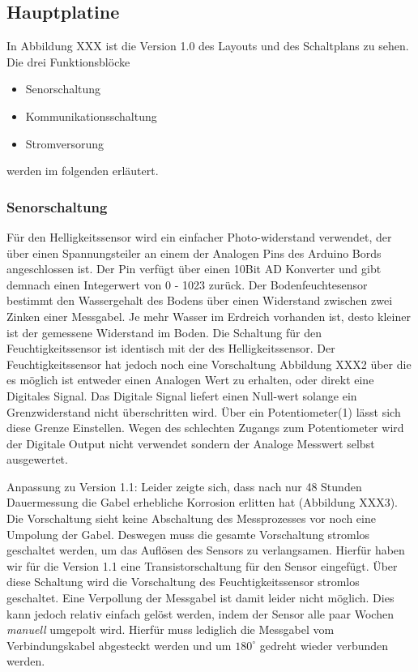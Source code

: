 \documentclass[]{IEEEtran}
\begin{document}
	\subsection{Hauptplatine}
		In Abbildung XXX ist die Version 1.0 des Layouts und des Schaltplans zu sehen. Die drei Funktionsblöcke
			\begin{itemize}
				\item Senorschaltung
				\item Kommunikationsschaltung
				\item Stromversorung
			\end{itemize}
		werden im folgenden erläutert. 
		
		
			
		\subsubsection{Senorschaltung} \label{sensorik}
		Für den Helligkeitssensor wird ein einfacher Photo-widerstand verwendet, der über einen Spannungsteiler an einem der Analogen Pins des Arduino Bords angeschlossen ist. Der Pin verfügt über einen 10Bit AD Konverter und gibt demnach einen Integerwert von 0 - 1023 zurück. 
		Der Bodenfeuchtesensor bestimmt den Wassergehalt des Bodens über einen Widerstand zwischen zwei Zinken einer Messgabel. Je mehr Wasser im Erdreich vorhanden ist, desto kleiner ist der gemessene Widerstand im Boden. Die Schaltung für den Feuchtigkeitssensor ist identisch mit der des Helligkeitssensor. Der Feuchtigkeitssensor hat jedoch noch eine Vorschaltung Abbildung XXX2 über die es möglich ist entweder einen Analogen Wert zu erhalten, oder direkt eine Digitales Signal. Das Digitale Signal liefert einen Null-wert solange ein Grenzwiderstand nicht überschritten wird. Über ein  Potentiometer(1) lässt sich diese Grenze Einstellen. Wegen des schlechten Zugangs zum Potentiometer wird der Digitale Output nicht verwendet sondern der Analoge Messwert selbst ausgewertet.
		
		Anpassung zu Version 1.1:
		Leider zeigte sich, dass nach nur 48 Stunden Dauermessung die Gabel erhebliche Korrosion erlitten hat (Abbildung XXX3). Die Vorschaltung sieht keine Abschaltung des Messprozesses vor noch eine Umpolung der Gabel. Deswegen muss die gesamte Vorschaltung stromlos geschaltet werden, um das Auflösen des Sensors zu verlangsamen. Hierfür haben wir für die Version 1.1 eine Transistorschaltung für den Sensor eingefügt. Über diese Schaltung wird die Vorschaltung des Feuchtigkeitssensor stromlos geschaltet. Eine Verpollung der Messgabel ist damit leider nicht möglich. Dies kann jedoch relativ einfach gelöst werden, indem der Sensor alle paar Wochen \emph{manuell} umgepolt wird. Hierfür muss lediglich die Messgabel vom Verbindungskabel abgesteckt werden und um 
		\begin{math}180^{\circ}\end{math} gedreht wieder verbunden werden. 
	
\end{document}
